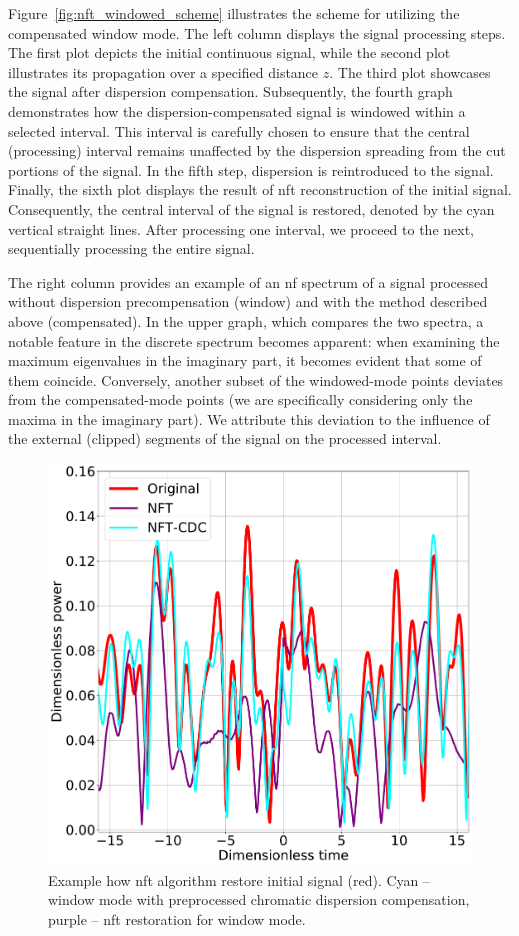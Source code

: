 Figure~\ref{fig:nft_windowed_scheme} illustrates the scheme for utilizing the compensated window mode. The left column displays the signal processing steps. The first plot depicts the initial continuous signal, while the second plot illustrates its propagation over a specified distance $z$. The third plot showcases the signal after dispersion compensation. Subsequently, the fourth graph demonstrates how the dispersion-compensated signal is windowed within a selected interval. This interval is carefully chosen to ensure that the central (processing) interval remains unaffected by the dispersion spreading from the cut portions of the signal. In the fifth step, dispersion is reintroduced to the signal. Finally, the sixth plot displays the result of \acrshort{nft} reconstruction of the initial signal. Consequently, the central interval of the signal is restored, denoted by the cyan vertical straight lines. After processing one interval, we proceed to the next, sequentially processing the entire signal.

The right column provides an example of an \acrshort{nf} spectrum of a signal processed without dispersion precompensation (window) and with the method described above (compensated).
%
In the upper graph, which compares the two spectra, a notable feature in the discrete spectrum becomes apparent: when examining the maximum eigenvalues in the imaginary part, it becomes evident that some of them coincide. Conversely, another subset of the windowed-mode points deviates from the compensated-mode points (we are specifically considering only the maxima in the imaginary part). We attribute this deviation to the influence of the external (clipped) segments of the signal on the processed interval.


\begin{figure}[tbp]
    \centering
        \includegraphics[width=0.5\linewidth]{images/window/nft_comp_cdc_m4dbm_final.pdf}
    \caption{Example how \acrshort{nft} algorithm restore initial signal (red). Cyan -- window mode with preprocessed chromatic dispersion compensation, purple -- \acrshort{nft} restoration for window mode.}
    \label{fig:nft_dbp_nft_and_cdc}
\end{figure}

